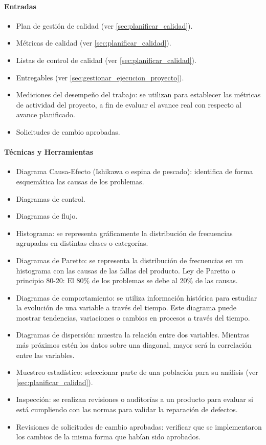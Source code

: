\documentclass[a4paper,twosides]{article}
\newlength{\wideitemsep}
\let\olditem\item
\renewcommand{\item}{\setlength{\itemsep}{\wideitemsep}\olditem}
\begin{document}
\paragraph{Entradas}
\begin{itemize}
\item Plan de gestión de calidad (ver \ref{sec:planificar_calidad}).
\item Métricas de calidad (ver \ref{sec:planificar_calidad}).
\item Listas de control de calidad (ver \ref{sec:planificar_calidad}).
\item Entregables (ver \ref{sec:gestionar_ejecucion_proyecto}).
\item Mediciones del desempeño del trabajo: se utilizan para establecer las métricas de actividad del proyecto, a fin de evaluar el avance real con respecto al avance planificado.
\item Solicitudes de cambio aprobadas.
\end{itemize}

\paragraph{Técnicas y Herramientas}
\begin{itemize}
\item Diagrama Causa-Efecto (Ishikawa o espina de pescado): identifica de forma esquemática las causas de los problemas.
\item Diagramas de control.
\item Diagramas de flujo.
\item Histograma: se representa gráficamente la distribución de frecuencias agrupadas en distintas clases o categorías.
\item Diagramas de Paretto: se representa la distribución de frecuencias en un histograma con las causas de las fallas del producto. Ley de Paretto o principio 80-20: El 80\% de los problemas se debe al 20\% de las causas.
\item Diagramas de comportamiento: se utiliza información histórica para estudiar la evolución de una variable a través del tiempo. Este diagrama puede mostrar tendencias, variaciones o cambios en procesos a través del tiempo.
\item Diagramas de dispersión: muestra la relación entre dos variables. Mientras más próximos estén los datos sobre una diagonal, mayor será la correlación entre las variables.
\item Muestreo estadístico: seleccionar parte de una población para su análisis (ver \ref{sec:planificar_calidad}).
\item Inspección: se realizan revisiones o auditorías a un producto para evaluar si está cumpliendo con las normas para validar la reparación de defectos.
\item Revisiones de solicitudes de cambio aprobadas: verificar que se implementaron los cambios de la misma forma que habían sido aprobados.
\end{itemize}
\end{document}
